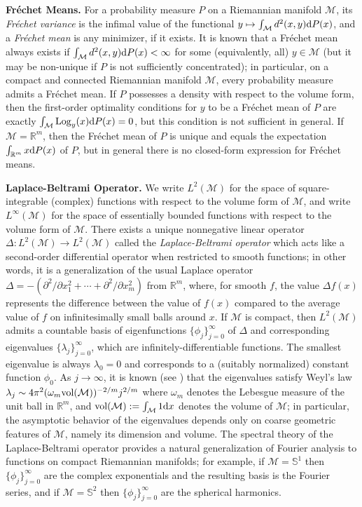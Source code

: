 \documentclass[preprint]{imsart}
\theoremstyle{plain}
\theoremstyle{definition}
\newcommand{\Rbb}{\mathbb{R}}
\newcommand{\Mcal}{\mathcal{M}}
\newcommand{\diff}{\textnormal{d}}
\newcommand{\vol}{\textnormal{vol}}
\DeclareMathOperator{\Log}{Log}
\begin{document}
\noindent \textbf{Fr\'echet Means.} For a probability measure $P$ on a Riemannian manifold $\Mcal$, its \textit{Fr\'echet variance} is the infimal value of the functional $y\mapsto \int_{\Mcal}d^2(x,y)\diff P(x)$, and a \textit{Fr\'echet mean} is any minimizer, if it exists.
It is known \cite[Lemma~2.13]{EvansJaffeSLLN} that a Fr\'echet mean always exists if $\int_{\Mcal}d^2(x,y)\diff P(x)<\infty$ for some (equivalently, all) $y\in\Mcal$ (but it may be non-unique if $P$ is not sufficiently concentrated); in particular, on a compact and connected Riemannian manifold $\Mcal$, every probability measure admits a Fr\'echet mean.
If $P$ possesses a density with respect to the volume form, then the first-order optimality conditions for $y$ to be a Fr\'echet mean of $P$ are exactly $\int_{\Mcal}\Log_y(x)\diff P(x) =0$, but this condition is not sufficient in general.
If $\Mcal=\Rbb^m$, then the Fr\'echet mean of $P$ is unique and equals the expectation $\int_{\Rbb^m}x\diff P(x)$ of $P$, but in general there is no closed-form expression for Fr\'echet means.

\medskip

\noindent \textbf{Laplace-Beltrami Operator.}
We write $L^2(\Mcal)$ for the space of square-integrable (complex) functions with respect to the volume form of $\Mcal$, and write $L^{\infty}(\Mcal)$ for the space of essentially bounded functions with respect to the volume form of $\Mcal$.
There exists a unique nonnegative linear operator $\Delta:L^2(\Mcal)\to L^2(\Mcal)$ called the \textit{Laplace-Beltrami operator} which acts like a second-order differential operator when restricted to smooth functions; in other words, it is a generalization of the usual Laplace operator $\Delta = -(\partial^2/\partial x_1^2+\cdots +\partial^2/\partial x_m^2)$ from $\Rbb^m$, where, for smooth $f$, the value $\Delta f(x)$ represents the difference between the value of $f(x)$ compared to the average value of $f$ on infinitesimally small balls around $x$.
If $\Mcal$ is compact, then $L^2(\Mcal)$ admits a countable basis of eigenfunctions $\{\phi_j\}_{j=0}^{\infty}$ of $\Delta$ and corresponding eigenvalues $\{\lambda_j\}_{j=0}^{\infty}$, which are infinitely-differentiable functions.
The smallest eigenvalue is always $\lambda_0=0$ and corresponds to a (suitably normalized) constant function $\phi_0$.
As $j\to\infty$, it is known (see \cite[Section~VI.4]{Chavel}) that the eigenvalues satisfy Weyl's law $\lambda_j\sim 4\pi^2(\omega_{m}\vol(\Mcal))^{-2/m}j^{2/m}$ where $\omega_m$ denotes the Lebesgue measure of the unit ball in $\Rbb^m$, and $\vol(\Mcal):=\int_{\Mcal}1\diff x$ denotes the volume of $\Mcal$; in particular, the asymptotic behavior of the eigenvalues depends only on coarse geometric features of $\Mcal$, namely its dimension and volume.
The spectral theory of the Laplace-Beltrami operator provides a natural generalization of Fourier analysis to functions on compact Riemannian manifolds; for example, if $\Mcal=\mathbb{S}^1$ then $\{\phi_{j}\}_{j=0}^{\infty}$ are the complex exponentials and the resulting basis is the Fourier series, and if $\Mcal=\mathbb{S}^2$ then $\{\phi_{j}\}_{j=0}^{\infty}$ are the spherical harmonics.
\end{document}
